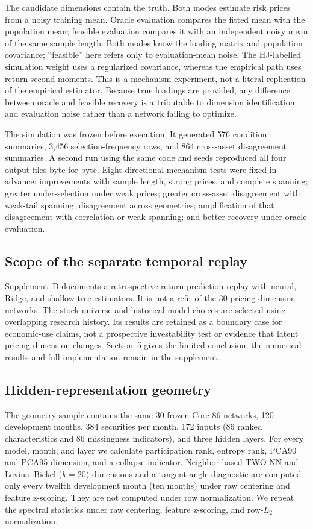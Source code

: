 The candidate dimensions contain the truth. Both modes estimate risk prices from a noisy training mean. Oracle evaluation compares the fitted mean with the population mean; feasible evaluation compares it with an independent noisy mean of the same sample length. Both modes know the loading matrix and population covariance; ``feasible'' here refers only to evaluation-mean noise. The HJ-labelled simulation weight uses a regularized covariance, whereas the empirical path uses return second moments. This is a mechanism experiment, not a literal replication of the empirical estimator. Because true loadings are provided, any difference between oracle and feasible recovery is attributable to dimension identification and evaluation noise rather than a network failing to optimize.

The simulation was frozen before execution. It generated 576 condition summaries, 3,456 selection-frequency rows, and 864 cross-asset disagreement summaries. A second run using the same code and seeds reproduced all four output files byte for byte. Eight directional mechanism tests were fixed in advance: improvements with sample length, strong prices, and complete spanning; greater under-selection under weak prices; greater cross-asset disagreement with weak-tail spanning; disagreement across geometries; amplification of that disagreement with correlation or weak spanning; and better recovery under oracle evaluation.

\subsection{Scope of the separate temporal replay}

Supplement~D documents a retrospective return-prediction replay with neural, Ridge, and shallow-tree estimators. It is not a refit of the 30 pricing-dimension networks. The stock universe and historical model choices are selected using overlapping research history. Its results are retained as a boundary case for economic-use claims, not a prospective investability test or evidence that latent pricing dimension changes. Section~5 gives the limited conclusion; the numerical results and full implementation remain in the supplement.

\subsection{Hidden-representation geometry}

The geometry sample contains the same 30 frozen Core-86 networks, 120 development months, 384 securities per month, 172 inputs (86 ranked characteristics and 86 missingness indicators), and three hidden layers. For every model, month, and layer we calculate participation rank, entropy rank, PCA90 and PCA95 dimension, and a collapse indicator. Neighbor-based TWO-NN and Levina--Bickel ($k=20$) dimensions and a tangent-angle diagnostic are computed only every twelfth development month (ten months) under raw centering and feature z-scoring. They are not computed under row normalization. We repeat the spectral statistics under raw centering, feature z-scoring, and row-$L_2$ normalization.

